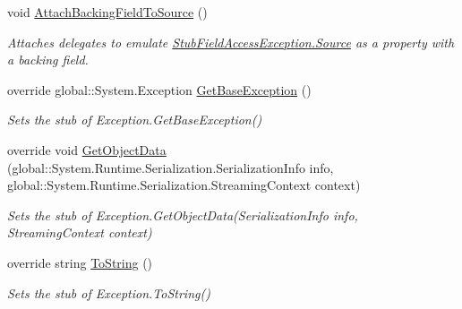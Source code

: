 \begin{DoxyCompactItemize}
void \hyperlink{class_system_1_1_fakes_1_1_stub_field_access_exception_acf7b3b359fab3ff6d0b43b3121586223}{Attach\-Backing\-Field\-To\-Source} ()
\begin{DoxyCompactList}\small\item\em Attaches delegates to emulate \hyperlink{class_system_1_1_fakes_1_1_stub_field_access_exception_ae813ee9977be20e0c838de477ef13f41}{Stub\-Field\-Access\-Exception.\-Source} as a property with a backing field.\end{DoxyCompactList}\item 
override global\-::\-System.\-Exception \hyperlink{class_system_1_1_fakes_1_1_stub_field_access_exception_ab2502bf5cdf06600e7e59e2438420b9c}{Get\-Base\-Exception} ()
\begin{DoxyCompactList}\small\item\em Sets the stub of Exception.\-Get\-Base\-Exception()\end{DoxyCompactList}\item 
override void \hyperlink{class_system_1_1_fakes_1_1_stub_field_access_exception_a3390862a29bf24958a92438ddc67c1ff}{Get\-Object\-Data} (global\-::\-System.\-Runtime.\-Serialization.\-Serialization\-Info info, global\-::\-System.\-Runtime.\-Serialization.\-Streaming\-Context context)
\begin{DoxyCompactList}\small\item\em Sets the stub of Exception.\-Get\-Object\-Data(\-Serialization\-Info info, Streaming\-Context context)\end{DoxyCompactList}\item 
override string \hyperlink{class_system_1_1_fakes_1_1_stub_field_access_exception_a2470d3bff8a88043213a57d941057899}{To\-String} ()
\begin{DoxyCompactList}\small\item\em Sets the stub of Exception.\-To\-String()\end{DoxyCompactList}\end{DoxyCompactItemize}
